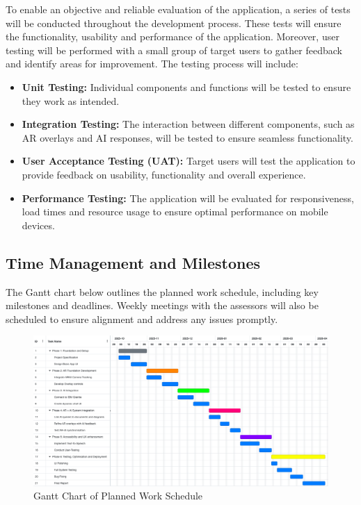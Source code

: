 \documentclass[10pt]{article}
\begin{document}
    To enable an objective and reliable evaluation of the application, a series of tests will be conducted throughout the development process. These tests will ensure the functionality, usability and performance of the application. Moreover, user testing will be performed with a
    small group of target users to gather feedback and identify areas for improvement. The testing process will include:
        \begin{itemize}
            \item \textbf{Unit Testing:} Individual components and functions will be tested to ensure they work as intended.
            \item \textbf{Integration Testing:} The interaction between different components, such as AR overlays and AI responses, will be tested to ensure seamless functionality.
            \item \textbf{User Acceptance Testing (UAT):} Target users will test the application to provide feedback on usability, functionality and overall experience.
            \item \textbf{Performance Testing:} The application will be evaluated for responsiveness, load times and resource usage to ensure optimal performance on mobile devices.
        \end{itemize}

    \subsection{Time Management and Milestones}
        The Gantt chart below outlines the planned work schedule, including key milestones and deadlines. Weekly meetings with the assessors will also be scheduled to ensure alignment and address any issues promptly. 
        \begin{figure}[H]
        \centering
        \includegraphics[width=\textwidth]{img/GanttChart.png}
        \caption{Gantt Chart of Planned Work Schedule}
        \label{fig:GanttChart}
        \end{figure}
\end{document}
